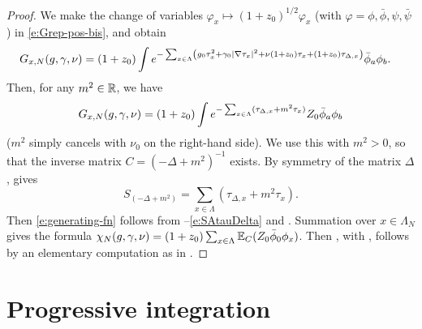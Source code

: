 \begin{proof}
We make the change of variables
$\varphi_x \mapsto (1 + z_0)^{1/2} \varphi_x$ (with $\varphi = \phi, \bar\phi, \psi, \bar\psi$)
in \eqref{e:Grep-pos-bis}, and obtain
\begin{align}
    G_{x,N}(g,\gamma,\nu)
    &=  (1+z_0)
    \int
    e^{-\sum_{x\in\Lambda}
    \left(
    g_0 \tau_x^2 + \gamma_0 |\nabla \tau_x|^2
    + \nu (1+z_0) \tau_x + (1+z_0)\tau_{\Delta,x}\right)} \bar\phi_a \phi_b
    .
    \label{e:Grep-pos}
\end{align}
Then, for any $m^2 \in{\mathbb R}$, we have
\begin{equation}
\lbeq{GNint}
G_{x,N}(\gcc,\gamma,\nu)
    =
(1 + z_0) \int
e^{-\sum_{x\in\Lambda} (\tau_{\Delta,x} + m^2 \tau_x)}
Z_0 \bar\phi_a \phi_b
\end{equation}
($m^2$ simply cancels with $\nu_0$ on the right-hand side).
We use this with $m^2>0$, so that the inverse matrix $C=(-\Delta+m^2)^{-1}$ exists.
By symmetry of the matrix $\Delta$,  gives
\begin{equation}
\label{e:SAtauDelta}
S_{(-\Delta+m^2)}
=
\sum_{x\in\Lambda} \left( \tau_{\Delta,x}
+ m^2  \tau_x \right).
\end{equation}
Then \eqref{e:generating-fn} follows from --\eqref{e:SAtauDelta} and .  Summation
over $x\in \Lambda_N$ gives the formula $\chi_N(g,\gamma,\nu) = (1+z_0)\sum_{x\in \Lambda} \mathbb{E}_C
(Z_0\bar\phi_0\phi_x)$.  Then , with , follows
by an elementary computation as in \cite[Section~\ref{log-sec:ga}]{BBS-saw4-log}.
\end{proof}


\section{Progressive integration}
\label{sec:prog}

